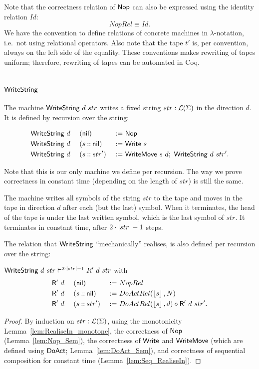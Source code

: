 Note that the correctness relation of $\mathsf{Nop}$ can also be expressed using the identity relation $Id$:
\[
  NopRel \equiv Id.
\]
We have the convention to define relations of concrete machines in $\lambda$-notation, i.e.\ not using relational operators.  Also note that the tape
$t'$ is, per convention, always on the left side of the equality.  These conventions makes rewriting of tapes uniform; therefore, rewriting of tapes
can be automated in Coq.

\section{$\MS{WriteString}$}
\label{sec:WriteString}
%

The machine $\mathsf{WriteString}~d~str$ writes a fixed string $str:\mathcal{L}(\Sigma)$ in the direction $d$.  It is defined by recursion over the string:
\begin{definition}[$\MS{WriteString}$][WriteString]
  \begin{alignat*}{3}
    &\mathsf{WriteString}~d~&&(\mathsf{nil})         &~:=~& \mathsf{Nop} \\
    &\mathsf{WriteString}~d~&&(s \mathbin{::} \mathsf{nil}) &~:=~& \mathsf{Write}~s \\
    &\mathsf{WriteString}~d~&&(s \mathbin{::} str') &~:=~& \mathsf{WriteMove}~s~d ;~ \mathsf{WriteString}~d~str'.
  \end{alignat*}
\end{definition}

Note that this is our only machine we define per recursion.  The way we prove correctness in constant time (depending on the length of $str$) is still
the same.

The machine writes all symbols of the string $str$ to the tape and moves in the tape in direction $d$ after each (but the last) symbol.  When it
terminates, the head of the tape is under the last written symbol, which is the last symbol of $str$.  It terminates in constant time, after
$2\cdot\left| str \right|-1$ steps.

The relation that $\MS{WriteString}$ ``mechanically'' realises, is also defined per recursion over the string:
\begin{lemma}
  $\mathsf{WriteString}~d~str \mathrel{\vDash^{2 \cdot \left| str \right| - 1}} R'~d~str$ with
  \begin{alignat*}{3}
    &\mathsf{R'}~d~&&(\mathsf{nil}        ) &~:=~& NopRel \\
    &\mathsf{R'}~d~&&(s \mathbin{::} \mathsf{nil}) &~:=~& DoActRel(\left\lfloor {s} \right\rfloor, N) \\
    &\mathsf{R'}~d~&&(s \mathbin{::} str') &~:=~& DoActRel(\left\lfloor {s} \right\rfloor, d) \circ \mathsf{R'}~d~str'.
  \end{alignat*}
\end{lemma}
\begin{proof}
  By induction on $str:\mathcal{L}(\Sigma)$, using the monotonicity Lemma~\ref{lem:RealiseIn_monotone}, the correctness of $\mathsf{Nop}$ (Lemma~\ref{lem:Nop_Sem}),
  the correctness of $\mathsf{Write}$ and $\mathsf{WriteMove}$ (which are defined using $\mathsf{DoAct}$; Lemma~\ref{lem:DoAct_Sem}), and correctness of
  sequential composition for constant time (Lemma~\ref{lem:Seq_RealiseIn}).
\end{proof}

